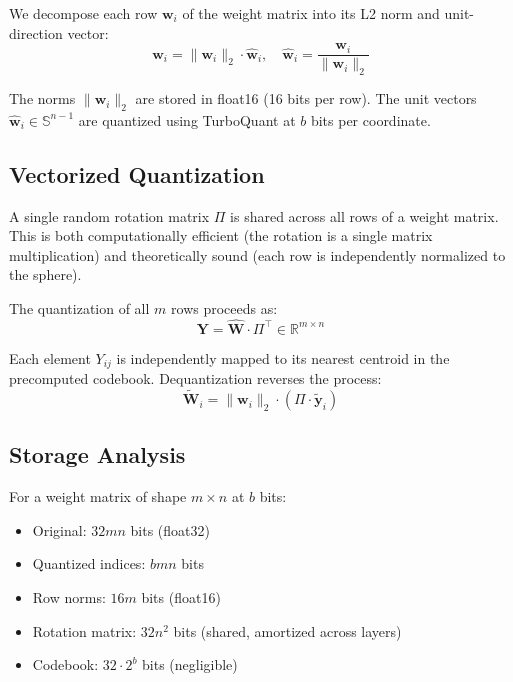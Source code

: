 \documentclass[11pt,twocolumn,letterpaper]{article}
\begin{document}
We decompose each row $\mathbf{w}_i$ of the weight matrix into its L2 norm and unit-direction vector:
\begin{equation}
\mathbf{w}_i = \|\mathbf{w}_i\|_2 \cdot \hat{\mathbf{w}}_i, \quad \hat{\mathbf{w}}_i = \frac{\mathbf{w}_i}{\|\mathbf{w}_i\|_2}
\end{equation}

The norms $\|\mathbf{w}_i\|_2$ are stored in float16 (16 bits per row). The unit vectors $\hat{\mathbf{w}}_i \in \mathbb{S}^{n-1}$ are quantized using TurboQuant at $b$ bits per coordinate.

\subsection{Vectorized Quantization}

A single random rotation matrix $\Pi$ is shared across all rows of a weight matrix. This is both computationally efficient (the rotation is a single matrix multiplication) and theoretically sound (each row is independently normalized to the sphere).

The quantization of all $m$ rows proceeds as:
\begin{equation}
\mathbf{Y} = \hat{\mathbf{W}} \cdot \Pi^\top \in \mathbb{R}^{m \times n}
\end{equation}

Each element $Y_{ij}$ is independently mapped to its nearest centroid in the precomputed codebook. Dequantization reverses the process:
\begin{equation}
\tilde{\mathbf{W}}_i = \|\mathbf{w}_i\|_2 \cdot (\Pi \cdot \tilde{\mathbf{y}}_i)
\end{equation}

\subsection{Storage Analysis}

For a weight matrix of shape $m \times n$ at $b$ bits:

\begin{itemize}
\item Original: $32mn$ bits (float32)
\item Quantized indices: $bmn$ bits
\item Row norms: $16m$ bits (float16)
\item Rotation matrix: $32n^2$ bits (shared, amortized across layers)
\item Codebook: $32 \cdot 2^b$ bits (negligible)
\end{itemize}
\end{document}
